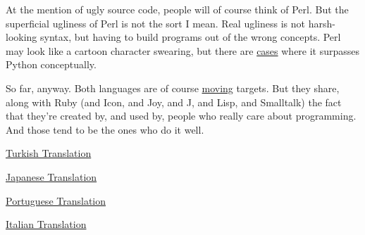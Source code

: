 At the mention of
                  ugly source code, people will of course think of Perl. But the
                  superficial ugliness of Perl is not the sort I mean. Real
                  ugliness is not harsh-looking syntax, but having to build
                  programs out of the wrong concepts. Perl may look like a
                  cartoon character swearing, but there are
                  \href{http://www.paulgraham.com/icad.html}{cases} where it surpasses Python
                  conceptually.

So far, anyway. Both languages are of
                  course \href{http://www.paulgraham.com/hundred.html}{moving} targets. But they
                  share, along with Ruby (and Icon, and Joy, and J, and Lisp,
                  and Smalltalk) the fact that they're created by, and used by,
                  people who really care about programming. And those tend to be
                  the ones who do it well.


              
            
          

            
              
            
            
              
                \href{http://www.fazlamesai.net/modules.php?file=article\&name=News\&sid=2330}{Turkish Translation}

              
              
              
                \href{http://www.shiro.dreamhost.com/scheme/trans/pypar-j.html}{Japanese Translation}

              
            
            
              
            
            
              
            
            
              
                \href{http://www.sounerd.com.br/index.php?option=com\_content\&task=view\&id=191\&Itemid=43}{Portuguese Translation}

              
              
              
                \href{http://www.invece.org/translations/pparadox.html}{Italian Translation}

              
            
            
              
            
            
